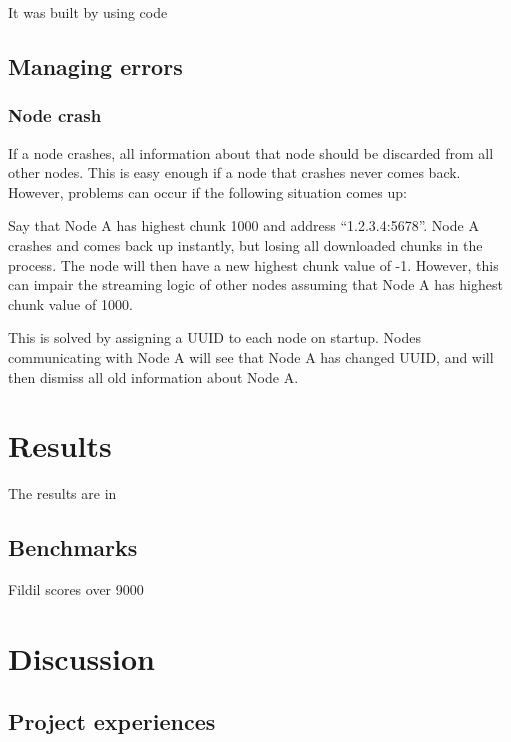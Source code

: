 \documentclass[10pt, a4paper]{article}
\begin{document}
It was built by using code

\subsection{Managing errors}

\subsubsection{Node crash}
If a node crashes, all information about that node should be discarded from all
other nodes. This is easy enough if a node that crashes never comes
back. However, problems can occur if the following situation comes up:

Say that Node A has highest chunk 1000 and address ``1.2.3.4:5678''. Node A
crashes and comes back up instantly, but losing all downloaded chunks in the
process. The node will then have a new highest chunk value of -1. However, this
can impair the streaming logic of other nodes assuming that Node A has highest
chunk value of 1000.

This is solved by assigning a UUID to each node on startup. Nodes communicating
with Node A will see that Node A has changed UUID, and will then dismiss all old
information about Node A.

\section{Results}
\label{sec:results}

The results are in

\subsection{Benchmarks}

Fildil scores over 9000

\section{Discussion}
\label{sec:discussion}

\subsection{Project experiences}

\end{document}
